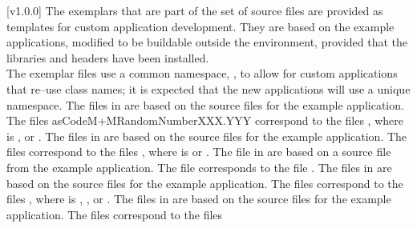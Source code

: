 [v1.0.0]
%
The exemplars that are part of the \mplusm{} set of source files are
provided as templates for custom application development.
They are based on the example applications, modified to be buildable outside the \mplusm{}
environment, provided that the \mplusm{} libraries and headers have been installed.\\

The exemplar files use a common namespace, , to allow for custom
applications that re--use class names; it is expected that the new applications will use
a unique namespace.
The files in  are based on the source files for the
 example application.
The files asCode{M+MRandomNumberXXX.YYY} correspond to the files
, where  is ,
 or .
The files in  are based on the source files for the
 example application.
The files  correspond to the files
, where  is  or .
The file in  are based on a source file from the
 example application.
The file  corresponds to the file
.
The files in  are based on the source files for the
 example application.
The files  correspond to the files
, where  is ,
,  or .
The files in  are based on the source files for the
 example application.
The files  correspond to the files

